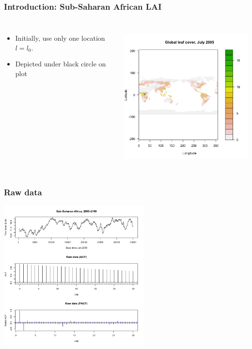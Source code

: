 \documentclass{beamer}
\begin{document}
\begin{frame}
\frametitle{Introduction: Sub-Saharan African LAI}
\begin{columns}

\column{2in}
\begin{itemize}
\item Initially, use only one location $l=l_0$.
\item Depicted under black circle on plot
\end{itemize}

\column{3in}
\includegraphics[height=3in]{../img/LAI_global_t0.png}

\end{columns}
\end{frame}


\begin{frame}
\frametitle{Raw data}
\includegraphics[height=3in]{../img/pacf_acf_raw.png}
\end{frame}
\end{document}
